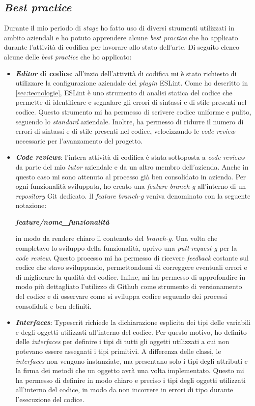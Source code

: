 \subsection{\textit{Best practice}}
Durante il mio periodo di \textit{stage} ho fatto uso di diversi strumenti utilizzati in ambito aziendali e ho potuto apprendere alcune \textit{best practice} che ho applicato durante l'attività di codifica per lavorare allo stato dell'arte. Di seguito elenco alcune delle \textit{best practice} che ho applicato:
\begin{itemize}
    \item \textbf{\textit{Editor} di codice}: all'inzio dell'attività di codifica mi è stato richiesto di utilizzare la configurazione aziendale del \textit{plugin} ESLint. Come ho descritto in \ref{sec:tecnologie}, ESLint è uno strumento di analisi statica del codice che permette di identificare e segnalare gli errori di sintassi e di stile presenti nel codice.  Questo strumento mi ha permesso di scrivere codice uniforme e pulito, seguendo lo \textit{standard} aziendale. Inoltre, ha permesso di ridurre il numero di errori di sintassi e di stile presenti nel codice, velocizzando le \textit{code review} necessarie per l'avanzamento del progetto.
    \item \textbf{\textit{Code reviews}}: l'intera attività di codifica è stata sottoposta a \textit{code reviews} da parte del mio \textit{tutor} aziendale e da un altro membro dell'azienda. Anche in questo caso mi sono attenuto al processo già ben consolidato in azienda. Per ogni funzionalità sviluppata, ho creato una \textit{feature \gls{branch-g}} all'interno di un \textit{repository} Git dedicato. Il \textit{feature \gls{branch-g}} veniva denominato con la seguente notazione:
    \begin{center}
        \textbf{\emph{feature/nome\_funzionalità}}
    \end{center}
    in modo da rendere chiaro il contenuto del \textit{\gls{branch-g}}. Una volta che completavo lo sviluppo della funzionalità, aprivo una \textit{\gls{pull-request-g}} per la \textit{code review}. Questo processo mi ha permesso di ricevere \textit{feedback} costante sul codice che stavo sviluppando, permettondomi di correggere eventuali errori e di migliorare la qualità del codice. Infine, mi ha permesso di approfondire in modo più dettagliato l'utilizzo di Github come strumento di versionamento del codice e di osservare come si sviluppa codice seguendo dei processi consolidati e ben definiti.
    \item \textbf{\textit{Interfaces}}: Typescrit richiede la dichiarazione esplicita dei tipi delle variabili e degli oggetti utilizzati all'interno del codice. Per questo motivo, ho definito delle \textit{interfaces} per definire i tipi di tutti gli oggetti utilizzati a cui non potevano essere assegnati i tipi primitivi. A differenza delle classi, le \textit{interfaces} non vengono instanziate, ma presentano solo i tipi degli attributi e la firma dei metodi che un oggetto avrà una volta implementato. Questo mi ha permesso di definire in modo chiaro e preciso i tipi degli oggetti utilizzati all'interno del codice, in modo da non incorrere in errori di tipo durante l'esecuzione del codice.

\end{itemize}
